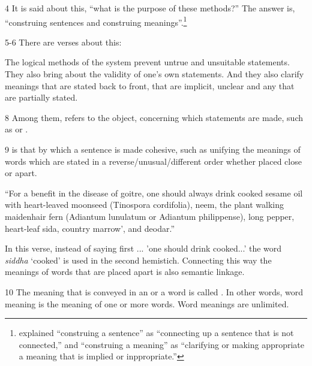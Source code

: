 \begin{translation}
\item [4] It is said about this, “what is the purpose of these methods?”
The answer is, “construing sentences and construing
meanings”.\footnote{ explained “construing a
    sentence” as “connecting up a sentence that is not connected,” and
    “construing a meaning” as “clarifying  or making appropriate a meaning
    that is implied or inppropriate.”}

\item [5-6] There are  verses about this:
  
\begin{sloka}
The logical methods of the system prevent untrue and unsuitable
statements. They also bring about the validity of one’s own
statements.  And they also clarify meanings that are stated back to
front, that are implicit, unclear and any that are partially stated.
\end{sloka}

\item [8] Among them,  refers to the object, concerning which statements are made, such as  or . 

\item [9]  is that by which a sentence is made 
cohesive, such as unifying the meanings of words which are stated in a 
reverse/unusual/different order whether placed close or apart.

``For a benefit in the disease of goitre, one should always drink cooked sesame oil with heart-leaved moonseed (Tinospora cordifolia), neem, the plant walking maidenhair fern (Adiantum lunulatum or Adiantum philippense), long pepper, heart-leaf sida, country marrow', and deodar.'' 

In this verse, instead of saying first ... 'one should drink 
cooked...' the word \emph{siddha} `cooked' is used in the second hemistich. 
Connecting this way the meanings of words that are placed apart is also 
semantic linkage.  
 

\item [10] The meaning that is conveyed in an  or a word is 
called . In other words, word meaning is the 
meaning of one or more words. Word meanings are unlimited. 


\end{translation}
